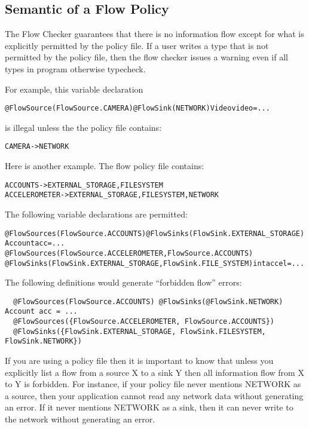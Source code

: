 \subsection{Semantic of a Flow Policy}
\label{sec:undsiredflows}
The Flow Checker guarantees that there is no information
flow except for what is explicitly permitted by the policy file. If a user writes a type that is
not permitted by the policy file, then the flow checker issues a warning
even if all types in program otherwise typecheck.

For example, this variable declaration

\begin{alltt}
@FlowSource(FlowSource.CAMERA) @FlowSink(NETWORK) Video video = ...
\end{alltt}

\noindent
is illegal unless the the policy file contains:

\begin{alltt}
CAMERA -> NETWORK
\end{alltt}

Here is another example.
The flow policy file contains:
\begin{alltt}
  ACCOUNTS      -> EXTERNAL_STORAGE, FILESYSTEM
  ACCELEROMETER -> EXTERNAL_STORAGE, FILESYSTEM, NETWORK
\end{alltt}

The following variable declarations are permitted:
\begin{alltt}
  @FlowSources(FlowSource.ACCOUNTS) @FlowSinks(FlowSink.EXTERNAL_STORAGE) Account acc = ...
  @FlowSources({FlowSource.ACCELEROMETER, FlowSource.ACCOUNTS})
  @FlowSinks({FlowSink.EXTERNAL_STORAGE, FlowSink.FILE_SYSTEM}) int accel = ...
\end{alltt}

The following definitions would generate ``forbidden flow'' errors:
\begin{Verbatim}
  @FlowSources(FlowSource.ACCOUNTS) @FlowSinks(@FlowSink.NETWORK) Account acc = ...
  @FlowSources({FlowSource.ACCELEROMETER, FlowSource.ACCOUNTS})
  @FlowSinks({FlowSink.EXTERNAL_STORAGE, FlowSink.FILESYSTEM, FlowSink.NETWORK})
\end{Verbatim}

If you are using a policy file then it is important to know that unless
you explicitly list a flow from a source X to a sink Y then all
information flow from X to Y is forbidden.  For instance,
if  your policy file never mentions NETWORK as a source, then your application
cannot read any network data without generating an error.  If it never
mentions NETWORK as a sink, then it can never write to the network without
generating an error.



